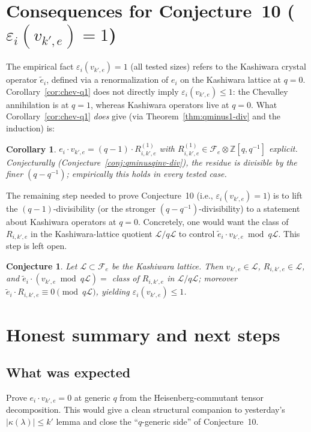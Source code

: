 \documentclass[11pt]{article}
\newtheorem{corollary}[theorem]{Corollary}
\newtheorem{conjecture}[theorem]{Conjecture}
\theoremstyle{definition}
\newcommand{\Fock}{\mathcal{F}}
\newcommand{\vke}{v_{k',e}}
\begin{document}
\section{Consequences for Conjecture~10 ($\varepsilon_i(\vke) = 1$)}

The empirical fact $\varepsilon_i(\vke) = 1$ (all tested sizes) refers to the
Kashiwara crystal operator $\tilde e_i$, defined via a renormalization of $e_i$
on the Kashiwara lattice at $q = 0$. Corollary~\ref{cor:chev-q1} does not
directly imply $\varepsilon_i(\vke) \le 1$: the Chevalley annihilation is at
$q = 1$, whereas Kashiwara operators live at $q = 0$. What
Corollary~\ref{cor:chev-q1} \emph{does} give (via Theorem~\ref{thm:qminus1-div}
and the induction) is:

\begin{corollary} \label{cor:linear-in-qminus1}
$e_i \cdot \vke = (q - 1) \cdot R_{i,k',e}^{(1)}$ with
$R_{i,k',e}^{(1)} \in \Fock_e \otimes \mathbb{Z}[q, q^{-1}]$ explicit.
Conjecturally (Conjecture~\ref{conj:qminusqinv-div}), the residue is divisible
by the finer $(q - q^{-1})$; empirically this holds in every tested case.
\end{corollary}

The remaining step needed to prove Conjecture~10 (i.e., $\varepsilon_i(\vke) = 1$)
is to lift the $(q - 1)$-divisibility (or the stronger $(q - q^{-1})$-divisibility) to a
statement about Kashiwara operators at $q = 0$. Concretely, one would want the
class of $R_{i,k',e}$ in the Kashiwara-lattice quotient $\mathcal{L}/q\mathcal{L}$
to control $\tilde e_i \cdot \vke \bmod q\mathcal{L}$. This step is left open.

\begin{conjecture} \label{conj:kashiwara}
    Let $\mathcal{L} \subset \Fock_e$ be the Kashiwara lattice. Then
    $\vke \in \mathcal{L}$, $R_{i,k',e} \in \mathcal{L}$, and
    $\tilde e_i \cdot (\vke \bmod q\mathcal{L}) = $ class of $R_{i,k',e}$ in
    $\mathcal{L}/q\mathcal{L}$; moreover $\tilde e_i \cdot R_{i,k',e} \equiv 0 \pmod{q \mathcal{L}}$,
    yielding $\varepsilon_i(\vke) \le 1$.
\end{conjecture}

\section{Honest summary and next steps}

\subsection*{What was expected}
Prove $e_i \cdot \vke = 0$ at generic $q$ from the Heisenberg-commutant tensor
decomposition. This would give a clean structural companion to
yesterday's $|\kappa(\lambda)| \le k'$ lemma and close the ``$q$-generic side''
of Conjecture~10.
\end{document}
